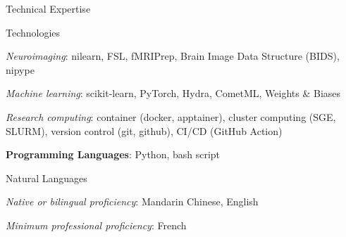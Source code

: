 \documentclass{resume} %
\begin{document}
\begin{rSection}{Technical Expertise}

\begin{rSubsection}{Technologies}{}{}{}
  \item \textit{Neuroimaging}: 
  	nilearn,
  	FSL, 
  	fMRIPrep, 
  	Brain Image Data Structure (BIDS), 
  	nipype
  \item \textit{Machine learning}: 
  	scikit-learn, PyTorch, Hydra, CometML, Weights \& Biases
  \item \textit{Research computing}: 
  	container (docker, apptainer),
  	cluster computing (SGE, SLURM),
  	version control (git, github), 
  	CI/CD (GitHub Action)
\end{rSubsection}

\textbf{Programming Languages}: Python, bash script

\begin{rSubsection}{Natural Languages}{}{}{}

  \item \textit{Native or bilingual proficiency}: Mandarin Chinese, English
  \item \textit{Minimum professional proficiency}: French

\end{rSubsection}


\end{rSection}
\end{document}

